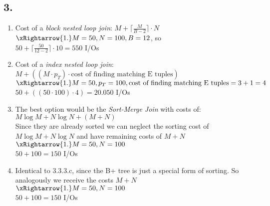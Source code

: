 \documentclass[12pt]{article}
\begin{document}
	\subsection*{3.}
		\begin{enumerate}[label=(\alph*)]
			\item Cost of a \textit{block nested loop join}: $M+\lceil \frac{M}{B-2}\rceil \cdot N$\\
				  $\xRightarrow{1.} M=50, N=100, B=12$, so \\
				  $50+\lceil\frac{50}{12-2}\rceil \cdot 10 = 550$ I/Os
			\item Cost of a \textit{index nested loop join}: $M+((M\cdot p_T)\cdot \text{cost of finding matching E tuples})$\\
				  $\xRightarrow{1.} M=50, p_T= 100, \text{cost of finding matching E tuples}=3+1=4$\\
				  $50+((50\cdot 100) \cdot 4) = 20.050$ I/Os
			\item The best option would be the \textit{Sort-Merge Join} with costs of: $M\log M + N \log N + (M+N)$\\
				  Since they are already sorted we can neglect the sorting cost of $M\log M + N \log N$ and have remaining costs of $M+N$\\
				  $\xRightarrow{1.} M=50, N=100$\\
				  $50+100=150$ I/Os
			\item Identical to 3.3.3.c, since the B+ tree is just a special form of sorting. So analogously we receive the costs $M+N$\\
				  $\xRightarrow{1.} M=50, N=100$\\
				  $50+100=150$ I/Os
		\end{enumerate}
		
\end{document}
